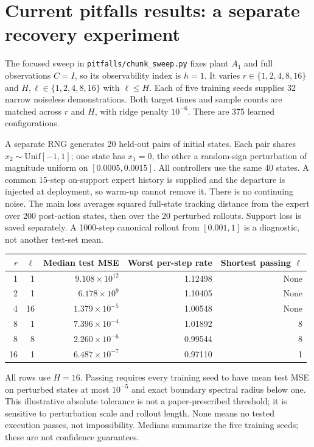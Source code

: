 \documentclass[11pt]{article}
\begin{document}
\section{Current pitfalls results: a separate recovery experiment}
The focused sweep in \texttt{pitfalls/chunk\_sweep.py} fixes plant $A_1$ and full observations $C=I$, so its observability index is $h=1$. It varies $r\in\{1,2,4,8,16\}$ and $H,\ell\in\{1,2,4,8,16\}$ with $\ell\le H$. Each of five training seeds supplies 32 narrow noiseless demonstrations. Both target times and sample counts are matched across $r$ and $H$, with ridge penalty $10^{-6}$. There are 375 learned configurations.

A separate RNG generates 20 held-out pairs of initial states. Each pair shares $x_2\sim\mathrm{Unif}[-1,1]$; one state has $x_1=0$, the other a random-sign perturbation of magnitude uniform on $[0.0005,0.0015]$. All controllers use the same 40 states. A common 15-step on-support expert history is supplied and the departure is injected at deployment, so warm-up cannot remove it. There is no continuing noise. The main loss averages squared full-state tracking distance from the expert over 200 post-action states, then over the 20 perturbed rollouts. Support loss is saved separately. A 1000-step canonical rollout from $[0.001,1]$ is a diagnostic, not another test-set mean.

\begin{center}\small
\begin{tabular}{rrrrr}\toprule
$r$ & $\ell$ & Median test MSE & Worst per-step rate & Shortest passing $\ell$\\\midrule
1&1&$9.108\times10^{12}$&1.12498&None\\
2&1&$6.178\times10^{9}$&1.10405&None\\
4&16&$1.379\times10^{-5}$&1.00548&None\\
8&1&$7.396\times10^{-4}$&1.01892&8\\
8&8&$2.260\times10^{-6}$&0.99544&8\\
16&1&$6.487\times10^{-7}$&0.97110&1\\\bottomrule
\end{tabular}
\end{center}
All rows use $H=16$. Passing requires every training seed to have mean test MSE on perturbed states at most $10^{-5}$ and exact boundary spectral radius below one. This illustrative absolute tolerance is not a paper-prescribed threshold; it is sensitive to perturbation scale and rollout length. None means no tested execution passes, not impossibility. Medians summarize the five training seeds; these are not confidence guarantees.
\end{document}
